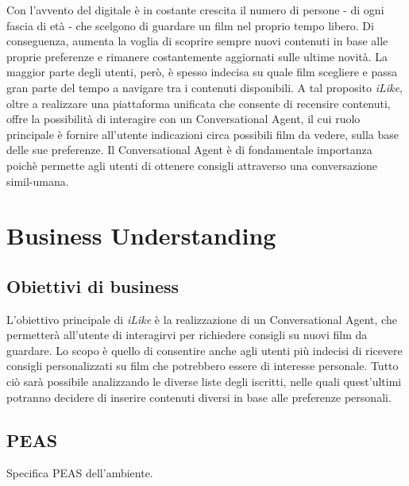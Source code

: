 \documentclass[a4paper, 10pt]{report}
\begin{document}
        Con l'avvento del digitale è in costante crescita il numero di persone - di ogni fascia di età - che scelgono
        di guardare un film nel proprio tempo libero. Di conseguenza, aumenta la voglia di scoprire sempre nuovi contenuti
        in base alle proprie preferenze e rimanere costantemente aggiornati sulle ultime novità. La maggior parte degli utenti,
        però, è spesso indecisa su quale film scegliere e passa gran parte del tempo a navigare tra i contenuti disponibili.
        A tal proposito \textit{iLike}, oltre a realizzare una piattaforma unificata che consente di recensire contenuti, offre
        la possibilità di interagire con un Conversational Agent, il cui ruolo principale è fornire all'utente indicazioni circa possibili
        film da vedere, sulla base delle sue preferenze.
        Il Conversational Agent è di fondamentale importanza poichè permette agli utenti di ottenere consigli attraverso una
        conversazione simil-umana.


    \chapter{Business Understanding}\label{ch:business-understanding}

        \section{Obiettivi di business}\label{sec:obiettivi-di-business}

            L'obiettivo principale di \textit{iLike} è la realizzazione di un Conversational Agent, che permetterà all'utente di
            interagirvi per richiedere consigli su nuovi film da guardare. Lo scopo è quello di consentire anche agli utenti più indecisi
            di ricevere consigli personalizzati su film che potrebbero essere di interesse personale.
            Tutto ciò sarà possibile analizzando le diverse liste degli iscritti, nelle quali quest'ultimi potranno decidere di inserire contenuti
            diversi in base alle preferenze personali.

        \section{PEAS}\label{sec:peas}

            Specifica PEAS dell'ambiente.\\
\end{document}
